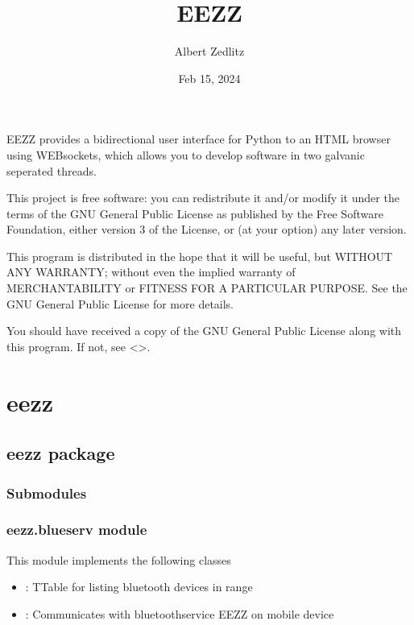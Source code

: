 \documentclass[letterpaper,10pt,english]{sphinxmanual}
\title{EEZZ}
\date{Feb 15, 2024}
\author{Albert Zedlitz}
\begin{document}
\pagestyle{empty}
\sphinxmaketitle
\pagestyle{plain}
\sphinxtableofcontents
\pagestyle{normal}
\label{\detokenize{index::doc}}


\sphinxAtStartPar
EEZZ provides a bidirectional user interface for Python to an HTML browser using
WEB\sphinxhyphen{}sockets, which allows you to develop software in two galvanic seperated threads.

\sphinxAtStartPar
This project is free software: you can redistribute it and/or modify
it under the terms of the GNU General Public License as published by
the Free Software Foundation, either version 3 of the License, or
(at your option) any later version.

\sphinxAtStartPar
This program is distributed in the hope that it will be useful,
but WITHOUT ANY WARRANTY; without even the implied warranty of
MERCHANTABILITY or FITNESS FOR A PARTICULAR PURPOSE.  See the
GNU General Public License for more details.

\sphinxAtStartPar
You should have received a copy of the GNU General Public License
along with this program.  If not, see <>.

\sphinxstepscope


\chapter{eezz}
\label{\detokenize{modules:eezz}}\label{\detokenize{modules::doc}}
\sphinxstepscope


\section{eezz package}
\label{\detokenize{eezz:eezz-package}}\label{\detokenize{eezz::doc}}

\subsection{Submodules}
\label{\detokenize{eezz:submodules}}

\subsection{eezz.blueserv module}
\label{\detokenize{eezz:module-eezz.blueserv}}\label{\detokenize{eezz:eezz-blueserv-module}}
\sphinxAtStartPar
This module implements the following classes
\begin{itemize}
\item {} 
\sphinxAtStartPar
{}:        TTable for listing bluetooth devices in range

\item {} 
\sphinxAtStartPar
{}: Communicates with bluetooth\sphinxhyphen{}service EEZZ on mobile device

\end{itemize}
\end{document}
